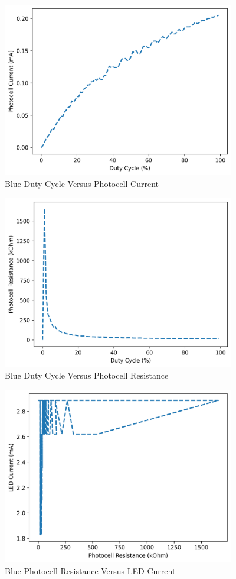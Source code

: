 \documentclass[12pt,titlepage]{article}
\begin{document}
\begin{figure}[!htb]
  \centering
  \includegraphics[width=4in]{lab_4/blue_duty_cycle_photo_curr.png}
  \caption{Blue Duty Cycle Versus Photocell Current}
\end{figure}
\begin{figure}[!htb]
\centering
\includegraphics[width=4in]{lab_4/blue_duty_cycle_photo_res.png}
\caption{Blue Duty Cycle Versus Photocell Resistance}
\end{figure}
\begin{figure}[!htb]
  \centering
  \includegraphics[width=4in]{lab_4/blue_photo_res_led_curr.png}
  \caption{Blue Photocell Resistance Versus LED Current}
\end{figure}
\end{document}

